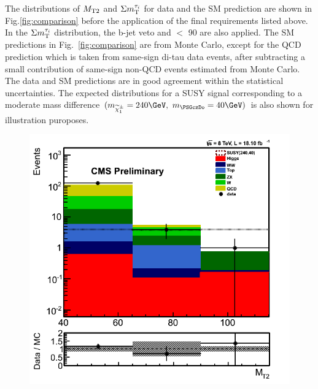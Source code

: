 The distributions of ${M_{\rm T2}}$ and $\Sigma m_{\rm T}^{\tau_i}$ for data and the SM prediction
are shown in Fig.\ref{fig:comparison} before the application of the final
requirements listed above.
In the $\Sigma m_{\rm T}^{\tau_i}$ distribution, the b-jet veto and \mttwo $<$ 90 \GeV are also applied.
The SM predictions in Fig.~\ref{fig:comparison} 
are from Monte Carlo, except for the
QCD prediction which is taken from same-sign di-tau data events,
after subtracting a small contribution of same-sign non-QCD events estimated from Monte Carlo.
The data and SM predictions are in good agreement within the statistical uncertainties.
The expected distributions for a SUSY signal 
corresponding to a moderate mass difference $(m_{\chione}=240\GeV,~m_{\PSGczDo}=40\GeV)$
is also shown for illustration puroposes.
\begin{figure}[!Hhtb]
\centering
\includegraphics[angle=0,scale=0.35]{TauTauFigs/mt2.png}

\end{figure}

